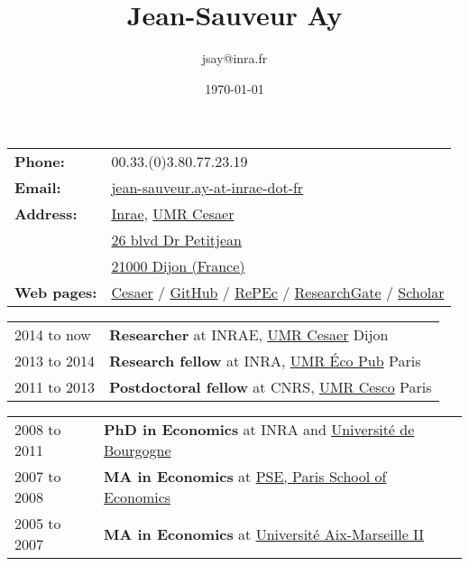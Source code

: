 \documentclass[11pt, a4paper]{./style}
\author{jsay@inra.fr}
\date{\today}
\title{Jean-Sauveur Ay}
\begin{document}
\maketitle


\label{sec:org172ba52}

\begin{center}
\begin{tabular}{ll}
\textbf{Phone:} & 00.33.(0)3.80.77.23.19\\
\textbf{Email:} & \href{mailto:jean-sauveur.ay@inrae.fr}{jean-sauveur.ay-at-inrae-dot-fr}\\
\textbf{Address:} & \href{https://www.inrae.fr/en/about-us}{Inrae}, \href{https://www2.dijon.inrae.fr/cesaer/en/axis/}{UMR Cesaer}\\
 & \href{https://www.google.com/maps/?q\%3D47.3097819,5.0644835}{26 blvd Dr Petitjean}\\
 & \href{https://www.google.com/maps/place/21000+Dijon/}{21000 Dijon (France)}\\
\textbf{Web pages:} & \href{https://www2.dijon.inrae.fr/cesaer/membres/jean-sauveur-ay/}{Cesaer} / \href{http://github.com/jsay/}{GitHub} / \href{https://ideas.repec.org/e/pay77.html}{RePEc} / \href{https://www.researchgate.net/profile/Jean\_Sauveur\_Ay}{ResearchGate} / \href{https://scholar.google.fr/citations?user=arEwxlIAAAAJ\&hl=fr}{Scholar}\\
\end{tabular}
\end{center}

\label{sec:org10378bf}

\begin{center}
\begin{tabular}{ll}
2014 to now & \textbf{Researcher} at INRAE, \href{https://www2.dijon.inrae.fr/cesaer/en/axis/}{UMR Cesaer} Dijon\\
2013 to 2014 & \textbf{Research fellow} at INRA, \href{https://www6.versailles-grignon.inrae.fr/economie\_publique\_eng/}{UMR Éco Pub} Paris\\
2011 to 2013 & \textbf{Postdoctoral fellow} at CNRS, \href{http://cesco.mnhn.fr/en}{UMR Cesco} Paris\\
\end{tabular}
\end{center}

\label{sec:org278ec95}

\begin{center}
\begin{tabular}{ll}
2008 to 2011 & \textbf{PhD in Economics} at INRA and \href{http://en.u-bourgogne.fr/}{Université de Bourgogne}\\
2007 to 2008 & \textbf{MA in Economics} at \href{https://www.parisschoolofeconomics.eu/en/}{PSE, Paris School of Economics}\\
2005 to 2007 & \textbf{MA in Economics} at \href{https://www.amse-aixmarseille.fr/en}{Université Aix-Marseille II}\\
\end{tabular}
\end{center}
\end{document}
